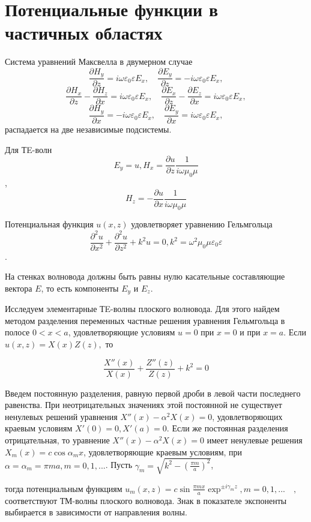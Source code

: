 \section{Потенциальные функции в частичных областях}

Система уравнений Максвелла в двумерном случае
\[  \frac{\partial H_y}{\partial z} = i\omega\varepsilon_0\varepsilon E_x , \quad 
\frac{\partial E_y}{\partial z} = -i\omega\varepsilon_0\varepsilon E_x
 ,\]
 \[  \frac{\partial H_x}{\partial z} -
  \frac{\partial H_z}{\partial x} =
 i\omega\varepsilon_0\varepsilon E_x , \quad 
\frac{\partial E_x}{\partial z} -
\frac{\partial E_z}{\partial x}=
i\omega\varepsilon_0\varepsilon E_x
, \]
\[  \frac{\partial H_y}{\partial x} = -i\omega\varepsilon_0\varepsilon E_x , \quad 
\frac{\partial E_y}{\partial x} = i\omega\varepsilon_0\varepsilon E_x
 ,\]
распадается на две независимые подсистемы.

Для ТE-волн
$$
	E_y=u, H_x= \frac{\partial u}{\partial z} \frac{1}{i\omega\mu_0\mu}
$$,
$$
	H_z=- \frac{\partial u}{\partial x} \frac{1}{i\omega\mu_0\mu}
$$

Потенциальная функция $u(x,z)$ удовлетворяет уравнению Гельмгольца 
$$ \frac{\partial^2 u}{\partial x^2} +
\frac{\partial^2 u}{\partial z^2} +
k^2u =0, k^2=\omega^2\mu_0\mu\varepsilon_0\varepsilon
$$.

На стенках волновода должны быть равны нулю касательные составляющие вектора $E$, то есть компоненты $E_y$ и $E_z$.

Исследуем элементарные ТE-волны плоского волновода. Для этого найдем методом разделения переменных частные решения уравнения Гельмгольца в полосе $0<x<a$, удовлетворяющие условиям $u=0$ при $x=0$ и при $x=a$. Если $u(x,z)= X(x)Z(z), $ то

$$
	\frac{X''(x)}{X(x)}+ \frac{Z''(z)}{Z(z)}+k^2=0
$$

Введем постоянную разделения, равную первой дроби в левой части последнего равенства. При неотрицательных значениях этой постоянной не существует ненулевых решений уравнения $ X''(x)- \alpha^2 X(x)=0$, удовлетворяющих краевым условиям $X'(0)=0, X'(a)=0 $. Если же постоянная разделения отрицательная, то уравнение $ X''(x)- \alpha^2 X(x)=0$ имеет ненулевые решения $X_m(x)= c\cos\alpha_mx$, удовлетворяющие краевым условиям, при $\alpha=\alpha_m=\pi m a, m=0,1,...$. Пусть 
$\gamma_m=\sqrt{k^2-\left(\frac{\pi m}{a}\right)^2}$,

тогда потенциальным функциям 
$ u_m(x,z)=c\sin\frac{\pi m x}{a}\exp^{\pm i\gamma_m z}, m=0,1,...\quad , $
соответствуют ТМ-волны плоского волновода. Знак в показателе экспоненты выбирается в зависимости от направления волны.

